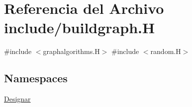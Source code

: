 \hypertarget{buildgraph_8_h}{}\section{Referencia del Archivo include/buildgraph.H}
\label{buildgraph_8_h}
{\ttfamily \#include $<$graphalgorithms.\+H$>$}\newline
{\ttfamily \#include $<$random.\+H$>$}\newline
\subsection*{Namespaces}
\begin{DoxyCompactItemize}
\item 
 \hyperlink{namespace_designar}{Designar}
\end{DoxyCompactItemize}

